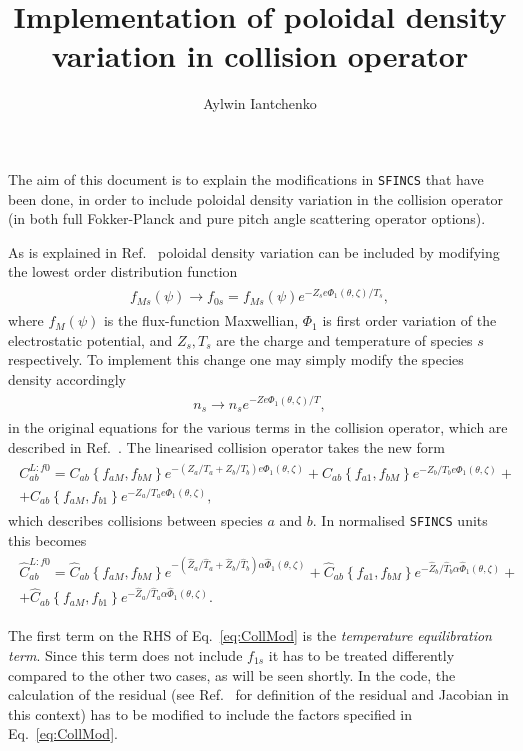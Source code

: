 \documentclass[12pt]{article}
\title{Implementation of poloidal density variation in collision operator}
\author{Aylwin Iantchenko}
\newcommand{\eq}[1]{\begin{align*}\begin{gathered}#1\end{gathered}\end{align*}}
\newcommand{\eqre}[1]{\begin{align}\begin{gathered}#1\end{gathered}\end{align}}
\begin{document}
\titlepage

\maketitle

The aim of this document is to explain the modifications in \texttt{SFINCS} that have been done, in order to include poloidal density variation in the collision operator (in both full Fokker-Planck and pure pitch angle scattering operator options). 

As is explained in Ref.~\cite{ref:PolVarColl_stefan} poloidal density variation can be included by modifying the lowest order distribution function 
\eq{
f_{Ms}(\psi) \rightarrow f_{0s} = f_{Ms}(\psi)e^{-Z_se\Phi_1(\theta,\zeta)/T_s},
}
where $f_M(\psi)$ is the flux-function Maxwellian, $\Phi_1$ is first order variation of the electrostatic potential, and $Z_s,T_s$ are the charge and temperature of species $s$ respectively. To implement this change one may simply modify the species density accordingly
\eqre{
\label{eq:densMod}
n_s \rightarrow n_se^{-Ze\Phi_1(\theta,\zeta)/T},
}
in the original equations for the various terms in the collision operator, which are described in Ref.~\cite{ref:Coll1}. The linearised collision operator takes the new form
\eqre{
C_{ab}^{L:f0} =  C_{ab}\left\{f_{aM},f_{bM}\right\}e^{-\left(Z_a/T_a + Z_b/T_b\right)e\Phi_1(\theta,\zeta)} + C_{ab}\left\{f_{a1},f_{bM}\right\}e^{-Z_b/T_be\Phi_1(\theta,\zeta)} + \\ + C_{ab}\left\{f_{aM},f_{b1}\right\}e^{-Z_a/T_ae\Phi_1(\theta,\zeta)},
}
which describes collisions between species $a$ and $b$. In normalised \texttt{SFINCS} units this becomes
\eqre{
\label{eq:CollMod}
\hat C_{ab}^{L:f0} = \hat C_{ab}\left\{f_{aM},f_{bM}\right\}e^{-\left(\hat Z_a/\hat T_a + \hat Z_b/\hat T_b\right) \alpha\hat\Phi_1(\theta,\zeta)} + \hat C_{ab}\left\{f_{a1},f_{bM}\right\}e^{-\hat Z_b/\hat T_b \alpha\hat\Phi_1(\theta,\zeta)} + \\ + \hat C_{ab}\left\{f_{aM},f_{b1}\right\}e^{-\hat Z_a/\hat T_a\alpha\hat\Phi_1(\theta,\zeta)}.
}

\noindent
The first term on the RHS of Eq.~\eqref{eq:CollMod} is the \textit{temperature equilibration term}. Since this term does not include $f_{1s}$ it has to be treated differently compared to the other two cases, as will be seen shortly. In the code, the calculation of the residual (see Ref.~\cite{ref:Phi1Implem} for definition of the residual and Jacobian in this context) has to be modified to include the factors specified in Eq.~\eqref{eq:CollMod}. 
\end{document}
